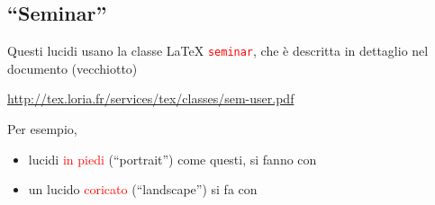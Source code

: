 \documentclass[a4,portrait,italian]{seminar}
\newcommand{\rosso}[1]{\textcolor{red}{#1}}
\theoremstyle{Ocra}
\theoremstyle{Blu}
\theoremstyle{Verde}
\begin{document}
\maketitle

\begin{slide*}

\section{\texorpdfstring{``Seminar''}{"Seminar"}}

Questi lucidi usano la classe \LaTeX{} \rosso{\texttt{seminar}}, che \`e descritta in dettaglio nel documento (vecchiotto)

\begin{center}
{\tiny
\url{http://tex.loria.fr/services/tex/classes/sem-user.pdf}
}\end{center}

Per esempio,

\begin{itemize}

\item lucidi \rosso{in piedi} (``portrait'') come questi, si fanno con

\item un lucido \rosso{coricato} (``landscape'') si fa con

\end{itemize}

\end{slide*}
\end{document}
